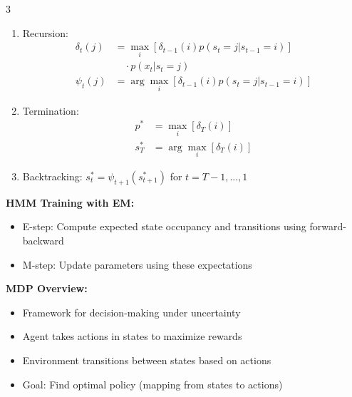 \documentclass[10pt,landscape]{article}
\begin{document}
\begin{multicols}{3}
\begin{tcolorbox}[breakable, title=9.1 Forward-Backward Algorithm for HMMs, colback=hmm,boxsep=1pt,left=1pt,right=1pt,top=1pt,bottom=1pt]
\begin{enumerate}[leftmargin=*,noitemsep,topsep=0pt]
    \item Recursion:
    \begin{align}
    \delta_t(j) &= \max_i [\delta_{t-1}(i)p(s_t = j|s_{t-1} = i)]\\
    &\quad\cdot p(x_t|s_t = j)\\
    \psi_t(j) &= \arg\max_i [\delta_{t-1}(i)p(s_t = j|s_{t-1} = i)]
    \end{align}
    
    \item Termination:
    \begin{align}
    p^* &= \max_i [\delta_T(i)]\\
    s^*_T &= \arg\max_i [\delta_T(i)]
    \end{align}
    
    \item Backtracking:
    $s^*_t = \psi_{t+1}(s^*_{t+1})$ for $t = T-1,...,1$
\end{enumerate}

\textbf{HMM Training with EM:}
\begin{itemize}[leftmargin=*,noitemsep,topsep=0pt]
    \item E-step: Compute expected state occupancy and transitions using forward-backward
    \item M-step: Update parameters using these expectations
\end{itemize}
\end{tcolorbox}

\begin{tcolorbox}[breakable, title=10. Markov Decision Processes Concepts, colback=mdp,boxsep=1pt,left=1pt,right=1pt,top=1pt,bottom=1pt]
\textbf{MDP Overview:}
\begin{itemize}[leftmargin=*,noitemsep,topsep=0pt]
    \item Framework for decision-making under uncertainty
    \item Agent takes actions in states to maximize rewards
    \item Environment transitions between states based on actions
    \item Goal: Find optimal policy (mapping from states to actions)
\end{itemize}


\end{tcolorbox}
\end{multicols}
\end{document}
